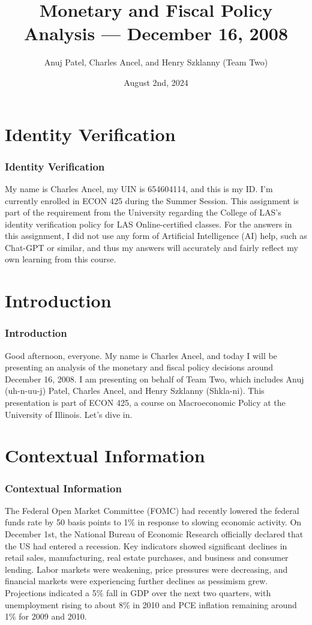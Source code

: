 \documentclass{beamer}
\title{Monetary and Fiscal Policy Analysis --- December 16, 2008}
\author{Anuj Patel, Charles Ancel, and Henry Szklanny (Team Two)}
\date{August 2nd, 2024}
\begin{document}
\frame{\titlepage}

\section{Identity Verification}
\begin{frame}
    \frametitle{Identity Verification}
    My name is Charles Ancel, my UIN is 654604114, and this is my ID. I'm currently enrolled in ECON 425 during the Summer Session. This assignment is part of the requirement from the University regarding the College of LAS's identity verification policy for LAS Online-certified classes. For the answers in this assignment, I did not use any form of Artificial Intelligence (AI) help, such as Chat-GPT or similar, and thus my answers will accurately and fairly reflect my own learning from this course.
\end{frame}

\section{Introduction}
\begin{frame}
    \frametitle{Introduction}
    Good afternoon, everyone. My name is Charles Ancel, and today I will be presenting an analysis of the monetary and fiscal policy decisions around December 16, 2008. I am presenting on behalf of Team Two, which includes Anuj (uh-n-uu-j) Patel, Charles Ancel, and Henry Szklanny (Shkla-ni). This presentation is part of ECON 425, a course on Macroeconomic Policy at the University of Illinois. Let's dive in.
\end{frame}

\section{Contextual Information}
\begin{frame}
    \frametitle{Contextual Information}
    The Federal Open Market Committee (FOMC) had recently lowered the federal funds rate by 50 basis points to 1\% in response to slowing economic activity. On December 1st, the National Bureau of Economic Research officially declared that the US had entered a recession. Key indicators showed significant declines in retail sales, manufacturing, real estate purchases, and business and consumer lending. Labor markets were weakening, price pressures were decreasing, and financial markets were experiencing further declines as pessimism grew. Projections indicated a 5\% fall in GDP over the next two quarters, with unemployment rising to about 8\% in 2010 and PCE inflation remaining around 1\% for 2009 and 2010.
\end{frame}
\end{document}
